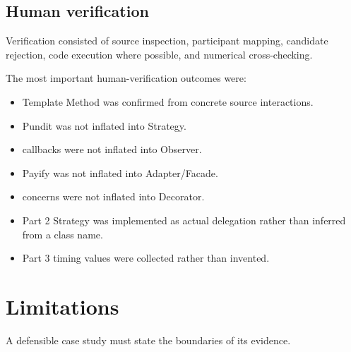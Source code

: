 \documentclass[10pt,a4paper]{article}
\begin{document}
\subsection{Human verification}

Verification consisted of source inspection, participant mapping, candidate rejection, code execution where possible, and numerical cross-checking.

The most important human-verification outcomes were:

\begin{itemize}[leftmargin=*]
\item Template Method was confirmed from concrete source interactions.
\item Pundit was not inflated into Strategy.
\item callbacks were not inflated into Observer.
\item Payify was not inflated into Adapter/Facade.
\item concerns were not inflated into Decorator.
\item Part 2 Strategy was implemented as actual delegation rather than inferred from a class name.
\item Part 3 timing values were collected rather than invented.
\end{itemize}

\section{Limitations}

A defensible case study must state the boundaries of its evidence.
\end{document}
